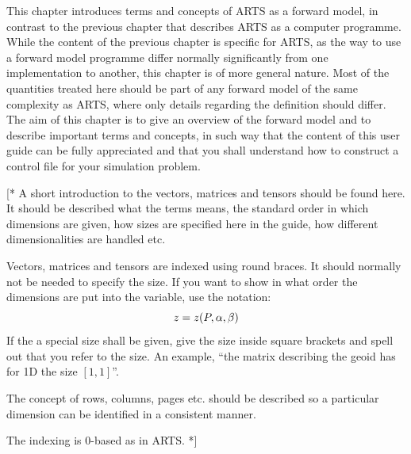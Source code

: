 This chapter introduces terms and concepts of ARTS as a forward model,
in contrast to the previous chapter that describes ARTS as a computer
programme. While the content of the previous chapter is specific for
ARTS, as the way to use a forward model programme differ normally
significantly from one implementation to another, this chapter is of
more general nature. Most of the quantities treated here should be
part of any forward model of the same complexity as ARTS, where only
details regarding the definition should differ. The aim of this
chapter is to give an overview of the forward model and to describe
important terms and concepts, in such way that the content of this user
guide can be fully appreciated and that you shall understand how to
construct a control file for your simulation problem.



\label{sec:fm_defs:math}

[* A short introduction to the vectors, matrices and tensors should be
found here. It should be described what the terms means, the standard
order in which dimensions are given, how sizes are specified here in
the guide, how different dimensionalities are handled etc.

Vectors, matrices and tensors are indexed using round braces.
It should normally not be needed to specify the size. If you want to
show in what order the dimensions are put into the variable, use the
notation:
\begin{equation}
  z = z(P,\alpha,\beta)
\end{equation}
If the a special size shall be given, give the size inside square
brackets and spell out that you refer to the size. An example, 
``the matrix describing the geoid has for 1D the size $[1,1]$''.

The concept of rows, columns, pages etc. should be described so a
particular dimension can be identified in a consistent manner.

The indexing is 0-based as in ARTS. *]



\label{sec:fm_defs:atmosphere}


\label{sec:fm_defs:atmdim}

